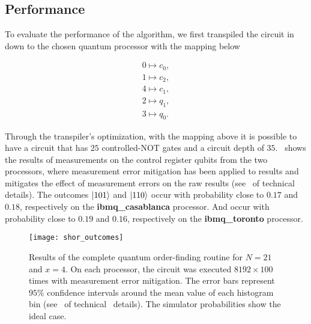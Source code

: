 
\subsection{Performance}

To evaluate the performance of the algorithm, we first transpiled the circuit in~ down to the chosen quantum processor with the mapping below

\begin{align}
    0 \mapsto c_0, \nonumber \\
    1 \mapsto c_2, \nonumber \\
    4 \mapsto c_1, \nonumber \\
    2 \mapsto q_1, \nonumber \\
    3 \mapsto q_0.
\end{align}

\noindent
Through the transpiler's optimization, with the mapping above it is possible to have a circuit that has $25$ controlled-NOT gates and a circuit depth of $35$.~ shows the results of measurements on the control register qubits from the two processors, where measurement error mitigation has been applied to results and mitigates the effect of measurement errors on the raw results (see~ of technical~ details). The outcomes $\ket{101}$ and $\ket{110}$ occur with probability close to $0.17$ and $0.18$, respectively on the \textbf{ibmq\_casablanca} processor. And occur with probability close to $0.19$ and $0.16$, respectively on the \textbf{ibmq\_toronto} processor.

\clearpage

\begin{figure}[t!]
    \centering
    \texttt{[image: shor\_outcomes]}
    \caption[Results of the complete quantum order-finding routine for ${N = 21}$ and ${x=4}$.]{Results of the complete quantum order-finding routine for ${N = 21}$ and ${x=4}$. On each processor, the circuit was executed ${8192 \times 100}$ times with measurement error mitigation. The error bars represent ${95\%}$ confidence intervals around the mean value of each histogram bin (see~\protect{} of technical~\protect{} details). The simulator probabilities show the ideal case.
    }
\end{figure}

